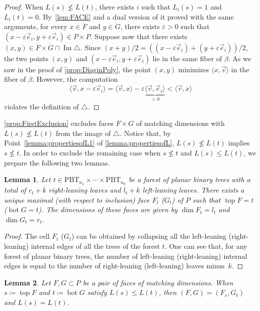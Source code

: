 \documentclass[JEP,XML,SOM,Unicode,NoFloatCountersInSection]{cedram}
\theoremstyle{plain}
\newtheorem{lemma}{Lemma}
\theoremstyle{definition}
\newcommand{\Tam}[1]{\mathrm{PBT}_{#1}}
\DeclareMathOperator{\tp}{top}
\DeclareMathOperator{\bm}{bot}
\newcommand{\ang}[1]{\langle #1\rangle}
\DeclareMathOperator{\im}{\mathrm{Im}}
\begin{document}
\begin{proof}
When $L(s)\not\leq L(t)$, there exists $i$ such that $L_i(s) = 1$ and $L_i(t) = 0$.
By~\cref{lem:FACE} and a dual version of it proved with the same arguments,
for every $x\in \mathring{F}$ and $y\in \mathring{G}$, there exists $\varepsilon>0$ such that $(x-\varepsilon \vec e_i, y+\varepsilon \vec e_i) \in P\times P$.
Suppose now that there exists $(x,y)\in \mathring{F}\times \mathring{G} \cap \im \triangle$.
Since $(x+y)/2 = ((x-\varepsilon\vec e_i)+(y+\varepsilon\vec e_i))/2$, the two points $(x, y)$ and $(x-\varepsilon\vec e_i, y+\varepsilon\vec e_i)$ lie in the same fiber of $\beta$. As we saw in the proof of
\cref{prop:DiaginPoly}, the point $(x,y)$ minimizes $\ang{x, \vec v}$ in the fiber of $\beta$.
However, the computation
\[
\ang{\vec v, x-\varepsilon \vec e_i}=\ang{\vec v, x}-\varepsilon\underbrace{\ang{\vec v, \vec e_i}}_{>0}
<\ang{\vec v, x}
\]
violates the definition of $\triangle$.
\end{proof}

\cref{prop:FirstExclusion} excludes
faces $F\times G$ of matching dimensions with $L(s)\not\leq L(t)$
from the image of $\triangle$.
Notice that, by Point~\eqref{lemma:propertiesofL1} of \cref{lemma:propertiesofL}, $L(s)\not\leq L(t)$ implies $s\not \leq t$.
In order to exclude the remaining case when $s\not\leq t$ and $L(s)\leq L(t)$, we prepare the following two lemmas.

\begin{lemma}\label{lem:UniqueFG}
Let $t\in \Tam{n_1}\times \cdots \times \Tam{n_k}$ be a forest of planar binary trees with a total of $r_t+k$ right-leaning leaves and $l_t+k$ left-leaning leaves. There exists a unique maximal (with respect to inclusion) face $F_t$ (\resp $G_t$) of $P$ such that \hbox{$\tp F\!=\!t$} (\resp $\bm G = t$). The dimensions of these faces are given by $\dim F_t =l_t$ and $\dim G_t = r_t$.
\end{lemma}

\begin{proof}
The cell $F_t$ (\resp $G_t$) can be obtained by collapsing all the left-leaning (\resp right-leaning) internal edges of all the trees of the forest $t$. One can see that, for any forest of planar binary trees, the number of left-leaning (\resp right-leaning) internal edges is equal to the number of right-leaning (\resp left-leaning) leaves minus~$k$.
\end{proof}

\begin{lemma}\label{lemma:Matching}
Let $F,G\subset P$ be a pair of faces of matching dimensions.
When $s\coloneqq \tp F$ and $t\coloneqq \bm G$ satisfy $L(s)\leq L(t)$, then $(F, G) = (F_s, G_t)$ and $L(s)=L(t)$.
\end{lemma}
\end{document}
